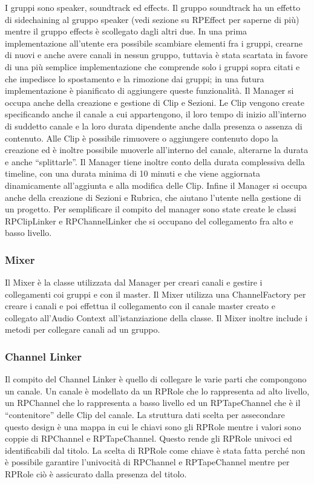 \documentclass[a4paper,12pt]{report}
\begin{document}
I gruppi sono speaker, soundtrack ed effects. Il gruppo soundtrack ha un effetto di sidechaining al gruppo speaker (vedi sezione su RPEffect per saperne di più) mentre il gruppo effects è scollegato dagli altri due. In una prima implementazione all’utente era possibile scambiare elementi fra i gruppi, crearne di nuovi e anche avere canali in nessun gruppo, tuttavia è stata scartata in favore di una più semplice implementazione che comprende solo i gruppi sopra citati e che impedisce lo spostamento e la rimozione dai gruppi; in una futura implementazione è pianificato di aggiungere queste funzionalità. Il Manager si occupa anche della creazione e gestione di Clip e Sezioni. Le Clip vengono create specificando anche il canale a cui appartengono, il loro tempo di inizio all’interno di suddetto canale e la loro durata dipendente anche dalla presenza o assenza di contenuto. Alle Clip è possibile rimuovere o aggiungere contenuto dopo la creazione ed è inoltre possibile muoverle all’interno del canale, alterarne la durata e anche “splittarle”. Il Manager tiene inoltre conto della durata complessiva della timeline, con una durata minima di 10 minuti e che viene aggiornata dinamicamente all’aggiunta e alla modifica delle Clip. Infine il Manager si occupa anche della creazione di Sezioni e Rubrica, che aiutano l’utente nella gestione di un progetto. Per semplificare il compito del manager sono state create le classi RPClipLinker e RPChannelLinker che si occupano del collegamento fra alto e basso livello.
\endsubsubsection
\subsubsection{Mixer}
Il Mixer è la classe utilizzata dal Manager per creari canali e gestire i collegamenti coi gruppi e con il master. Il Mixer utilizza una ChannelFactory per creare i canali e poi effettua il collegamento con il canale master creato e collegato all'Audio Context all’istanziazione della classe. Il Mixer inoltre include i metodi per collegare canali ad un gruppo.
\endsubsubsection
\subsubsection{Channel Linker}
Il compito del Channel Linker è quello di collegare le varie parti che compongono un canale. Un canale è modellato da un RPRole che lo rappresenta ad alto livello, un RPChannel che lo rappresenta a basso livello ed un RPTapeChannel che è il “contenitore” delle Clip del canale. La struttura dati scelta per assecondare questo design è una mappa in cui le chiavi sono gli RPRole mentre i valori sono coppie di RPChannel e RPTapeChannel. Questo rende gli RPRole univoci ed identificabili dal titolo. La scelta di RPRole come chiave è stata fatta perché non è possibile garantire l’univocità di RPChannel e RPTapeChannel mentre per RPRole ciò è assicurato dalla presenza del titolo.
\endsubsubsection
\end{document}
